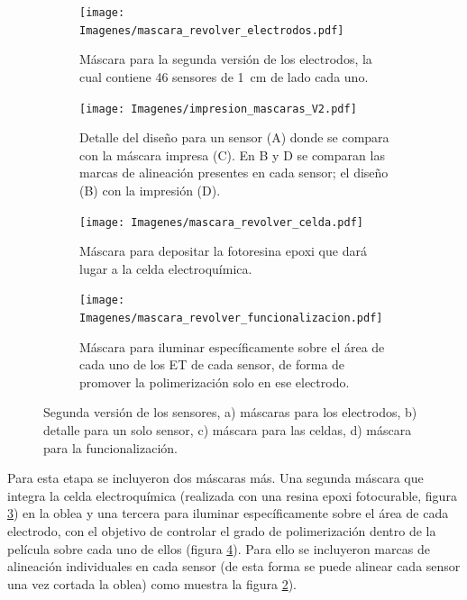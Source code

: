 {			     			\begin{figure}[th!]
			 	   	    \centering
			 	   	    \begin{subfigure}[t]{0.495\textwidth}
			        	\texttt{[image: Imagenes/mascara\_revolver\_electrodos.pdf]}
			       		\caption{Máscara para la segunda versión de los electrodos, la cual contiene 46 sensores de \SI{1}{cm} de lado cada uno.}
			         	\label{fig:mascara_v2}
			     		\end{subfigure}
			     		\begin{subfigure}[t]{0.495\textwidth}
			     		\texttt{[image: Imagenes/impresion\_mascaras\_V2.pdf]}
			    		\caption{Detalle del diseño para un sensor (A) donde se compara con la máscara impresa (C). En B y D se comparan las marcas de alineación presentes en cada sensor; el diseño (B) con la impresión (D).}
			     		\label{fig:impresion_diseno_v2_b}	
						\end{subfigure}
			     		\begin{subfigure}[t]{0.495\textwidth}
			         	\texttt{[image: Imagenes/mascara\_revolver\_celda.pdf]}
			        	\caption{Máscara para depositar la fotoresina epoxi que dará lugar a la celda electroquímica.}
			         	\label{fig:mascara_su8}
			     		\end{subfigure}
						\begin{subfigure}[t]{0.495\textwidth}
			     		\texttt{[image: Imagenes/mascara\_revolver\_funcionalizacion.pdf]}
			        	\caption{Máscara para iluminar específicamente sobre el área de cada uno de los ET de cada sensor, de forma de promover la polimerización solo en ese electrodo.}
			         	\label{fig:mascara_funcionalizacion}
			     		\end{subfigure}
			     		\caption[Juego de máscara. Segunda versión]{Segunda versión de los sensores, a) máscaras  para los electrodos, b) detalle para un solo sensor, c) máscara para las celdas, d) máscara para la funcionalización.}
			     		\label{fig:impresion_diseno_V2}
			     	   	\end{figure}
	
			     		
		 Para esta etapa se incluyeron dos máscaras más. Una segunda máscara que integra la celda electroquímica (realizada con una resina epoxi fotocurable, figura \ref{fig:mascara_su8}) en la oblea y una tercera para iluminar específicamente sobre el área de cada electrodo, con el objetivo de controlar el grado de polimerización dentro de la película sobre cada uno de ellos (figura \ref{fig:mascara_funcionalizacion}). Para ello se incluyeron marcas de alineación individuales en cada sensor (de esta forma se puede alinear cada sensor una vez cortada la oblea) como muestra la figura \ref{fig:impresion_diseno_v2_b}).
		
}
